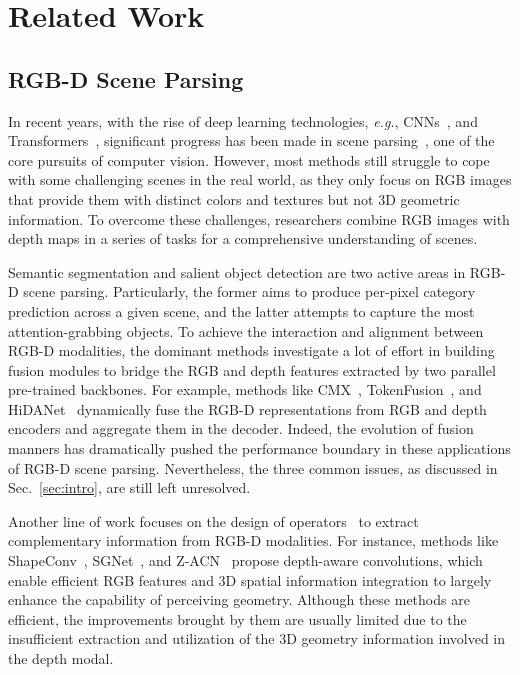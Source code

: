 \documentclass{article}
\begin{document}
\section{Related Work}


\subsection{RGB-D Scene Parsing}
In recent years, with the rise of deep learning technologies, \emph{e.g.}, CNNs~\citep{he2016resnet}, and Transformers~\citep{vaswani2017attention,sere,zhou2023srformer}, significant progress has been made in scene parsing~\citep{sun2020exploring,xie2021segformer,yin2022camoformer,zhang2023referring,chen2023yolo}, one of the core pursuits of computer vision. 
However, most methods still struggle to cope with some challenging scenes in the real world, as they only focus on RGB images that provide them with distinct colors and textures but not 3D geometric information. 
To overcome these challenges, researchers combine RGB images with depth maps in a series of tasks for a comprehensive understanding of scenes.

Semantic segmentation and salient object detection are two active areas in RGB-D scene parsing. 
Particularly, the former aims to produce per-pixel category prediction across a given scene, and the latter attempts to capture the most attention-grabbing objects.
To achieve the interaction and alignment between RGB-D modalities, the dominant methods investigate a lot of effort in building fusion modules to bridge the RGB and depth features extracted by two parallel pre-trained backbones.
For example, methods like CMX~\citep{zhang2022cmx}, TokenFusion~\citep{wang2022multimodal}, and HiDANet~\citep{wu2023hidanet} dynamically fuse the RGB-D representations from RGB and depth encoders and aggregate them in the decoder.
Indeed, the evolution of fusion manners has dramatically pushed the performance boundary in these applications of RGB-D scene parsing.
Nevertheless, the three common issues, as discussed in Sec.~\ref{sec:intro}, are still left unresolved.


Another line of work focuses on the design of operators~\citep{wang2018depth,wu2020depth,cao2021shapeconv,chen2021spatial_guided} to extract complementary information from RGB-D modalities. 
For instance, methods like ShapeConv~\citep{cao2021shapeconv}, SGNet~\citep{chen2021spatial_guided}, and Z-ACN~\citep{wu2022depth} propose depth-aware convolutions, which enable efficient RGB features and 3D spatial information integration to largely enhance the capability of perceiving geometry.
Although these methods are efficient, the improvements brought by them are usually limited due to the insufficient extraction and utilization of the 3D geometry information involved in the depth modal.
\end{document}
